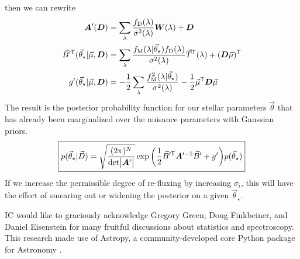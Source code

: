 \documentclass[preprint]{aastex} %
\newcommand{\vt}{\vec{\theta}}
\newcommand{\vstar}{\vt_{\star}}
\newcommand{\fM}{f_{\rm M}}
\newcommand{\fD}{f_{\rm D}}
\newcommand{\vD}{\vec{D}}
\newcommand{\trans}{\mathsf{T}}
\begin{document}
then we can rewrite
\begin{align}
  {\bm A}^\prime({\bm D}) &= \sum_\lambda \frac{\fD(\lambda)}{\sigma^2(\lambda)} {\bm W}(\lambda) + {\bm D}\\
  \vec{B}^{\prime\trans}(\vstar | \vec{\mu}, {\bm D}) &= \sum_\lambda \frac{\fM(\lambda | \vstar) \fD(\lambda)}{\sigma^2(\lambda)} \vec{T}^\trans(\lambda) + ({\bm D} \vec{\mu})^\trans \\
  g^\prime(\vstar | \vec{\mu}, {\bm D}) &= -\frac{1}{2} \sum_\lambda \frac{\fM^2(\lambda|\vstar)}{\sigma^2(\lambda)}- \frac{1}{2} \vec{\mu}^\trans {\bm D} \vec{\mu}\\
\end{align}
The result is the posterior probability function for our stellar parameters $\vt$ that has already been marginalized over the nuisance parameters with Gaussian priors.
\begin{equation}
  \boxed{
  p(\vstar | \vD) = \sqrt{\frac{(2 \pi )^N}{ {\rm det} \bigl |{\bm A}^\prime \bigr |}} \exp{ \left ( \frac{1}{2} \vec{B}^{\prime\trans} {\bm A}^{\prime -1} \vec{B}^\prime + g^\prime \right )} p(\vstar)
}
\end{equation}
If we increase the permissible degree of re-fluxing by increasing $\sigma_i$, this will have the effect of smearing out or widening the posterior on a given $\vstar$.

\acknowledgments
IC would like to graciously acknowledge Gregory Green, Doug Finkbeiner, and Daniel Eisenstein for many fruitful discussions about statistics and spectroscopy. This research made use of Astropy, a community-developed core Python package for Astronomy \citep{art+13}.

%
%



\end{document}
